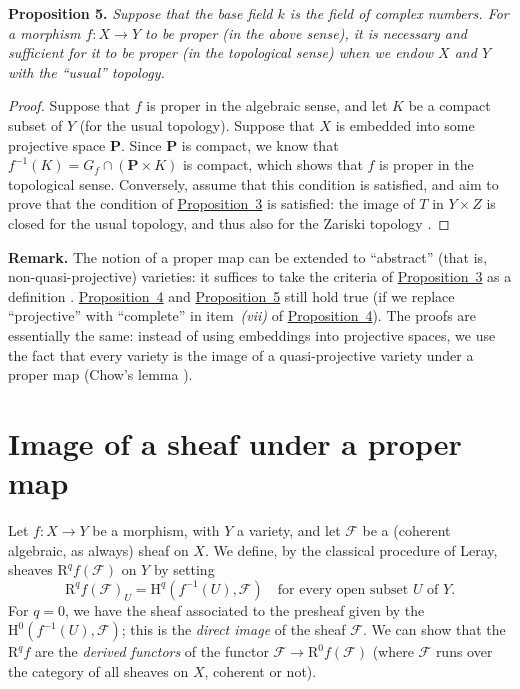 \documentclass{article}
\newenvironment{itenv}[1]
  {\phantomsection\par\medskip\noindent\textbf{#1.}\itshape}
  {\par\medskip}
\newenvironment{rmenv}[1]
  {\phantomsection\par\medskip\noindent\textbf{#1.}\rmfamily}
  {\par\medskip}
\newcommand{\scr}[1]{{\mathscr{#1}}}
\newcommand{\HH}{\mathrm{H}}
\newcommand{\RR}{\mathrm{R}}
\newcommand{\PP}{\mathbf{P}}
\newcommand{\oldpage}[1]{\marginpar{\footnotesize$\Big\vert$ \textit{p.~#1}}}
\begin{document}
\begin{itenv}{Proposition 5}
\label{proposition5}
  Suppose that the base field $k$ is the field of complex numbers.
  For a morphism $f\colon X\to Y$ to be proper (in the above sense), it is necessary and sufficient for it to be proper (in the topological sense) when we endow $X$ and $Y$ with the ``usual'' topology.
\end{itenv}

\begin{proof}
  Suppose that $f$ is proper in the algebraic sense, and let $K$ be a compact subset of $Y$ (for the usual topology).
  Suppose that $X$ is embedded into some projective space $\PP$.
  Since $\PP$ is compact, we know that $f^{-1}(K)=G_f\cap(\PP\times K)$ is compact, which shows that $f$ is proper in the topological sense.
  Conversely, assume that this condition is satisfied, and aim to prove that the condition of \hyperref[proposition3]{Proposition~3} is satisfied:
\oldpage{102}
  the image of $T$ in $Y\times Z$ is closed for the usual topology, and thus also for the Zariski topology \cite[proposition~7, p.~12]{13}.
\end{proof}

\begin{rmenv}{Remark}
  The notion of a proper map can be extended to ``abstract'' (that is, non-quasi-projective) varieties:
  it suffices to take the criteria of \hyperref[proposition3]{Proposition~3} as a definition \cite{4}.
  \hyperref[proposition4]{Proposition~4} and \hyperref[proposition5]{Proposition~5} still hold true (if we replace ``projective'' with ``complete'' in item~\emph{(vii)} of \hyperref[proposition4]{Proposition~4}).
  The proofs are essentially the same:
  instead of using embeddings into projective spaces, we use the fact that every variety is the image of a quasi-projective variety under a proper map (Chow's lemma \cite{4,14}).
\end{rmenv}


\section{Image of a sheaf under a proper map}
\label{section3}

Let $f\colon X\to Y$ be a morphism, with $Y$ a variety, and let $\scr{F}$ be a (coherent algebraic, as always) sheaf on $X$.
We define, by the classical procedure of Leray, sheaves $\RR^qf(\scr{F})$ on $Y$ by setting
\[
  \RR^qf(\scr{F})_U = \HH^q(f^{-1}(U),\scr{F})
  \quad\mbox{for every open subset $U$ of $Y$.}
\]
For $q=0$, we have the sheaf associated to the presheaf given by the $\HH^0(f^{-1}(U),\scr{F})$;
this is the \emph{direct image} of the sheaf $\scr{F}$.
We can show \cite{7} that the $\RR^qf$ are the \emph{derived functors} of the functor $\scr{F}\to\RR^0f(\scr{F})$ (where $\scr{F}$ runs over the category of all sheaves on $X$, coherent or not).
\end{document}
